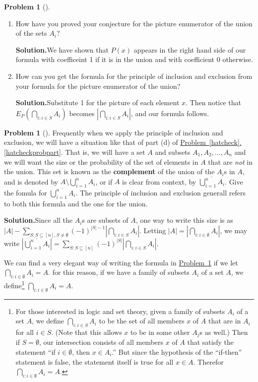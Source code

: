 \documentclass[10pt,]{book}
\newcommand{\terminology}[1]{\textbf{#1}}
\theoremstyle{plain}
\theoremstyle{definition}
\newtheorem{activity}[project]{Problem}
\theoremstyle{definition}
\numberwithin{equation}{chapter}
\begin{document}
\begin{activity}[]
\begin{enumerate}[font=\bfseries,label=(\alph*),ref=\alph*]
\item\label{task-172} How have you proved your conjecture for the picture enumerator of the union of the sets \(A_i\)?%
\par\medskip\noindent%
\textbf{Solution.}\quad We have shown that \(P(x)\) appears in the right hand side of our formula with coefficeint 1 if it is in the union and with coefficient 0 otherwise.%
\item\label{task-173} How can you get the formula for the principle of inclusion and exclusion from your formula for the picture enumerator of the union?%
\par\medskip\noindent%
\textbf{Solution.}\quad Substitute 1 for the picture of each element \(x\).  Then notice that \(E_P(\bigcap_{i:i \in S}A_i)\) becomes \(\left| \bigcap_{i:i \in S}A_i\right|\), and our formula follows.%
\end{enumerate}
\end{activity}
\begin{activity}[]\label{compunion}
Frequently when we apply the principle of inclusion and exclusion, we will have a situation like that of part (d) of \hyperref[hatcheckprobpart]{Problem~\ref{hatcheck}.\ref{hatcheckprobpart}}.  That is, we will have a set \(A\) and subsets \(A_1, A_2, \ldots, A_n\) and we will want the size or the probability of the set of elements in \(A\) that are \emph{not} in the union.  This set is known as the \terminology{complement}  of the union of the \(A_i\)s in \(A\), and is denoted by \(A \setminus \bigcup_{i=1}^n A_i\), or if \(A\) is clear from context, by \(\overline{\bigcup_{i=1}^n A_i}\). Give the fomula for \(\overline{\bigcup_{i=1}^n A_i}\).  The principle of inclusion and exclusion generall refers to both this formula and the one for the union.%
\par\medskip\noindent%
\textbf{Solution.}\quad Since all the \(A_i\)s are subsets of \(A\), one way to write this size is as \(|A| - \sum_{S:S \subseteq [n], S \ne \emptyset}(-1)^{|S|-1} |\bigcap_{i:i \in S}A_i|\).  Letting \(|A| = \left|\bigcap_{i:i \in \emptyset} A_i\right|\), we may write \(\left|\overline{\bigcup_{i=1}^n A_i}\right| = \sum_{S:S \subseteq [n]} (-1)^{|S|}\left| \bigcap_{i:i\in S} A_i\right|\).%
\end{activity}
We can find a very elegant way of writing the formula in \hyperref[compunion]{Problem~\ref{compunion}} if we let \(\bigcap_{i:i\in\emptyset}A_i = A\).  for this reason, if we have a family of subsets \(A_i\) of a set \(A\), we define\footnote{For those interested in logic and set theory, given a family of subsets \(A_i\) of a set \(A\), we define \(\bigcap_{i:i\in S}A_i\) to be the set of all members \(x\) of \(A\) that are in \(A_i\) for all \(i \in S\).  (Note that this allows \(x\) to be in some other \(A_j\)s as well.)  Then if \(S = \emptyset\), our intersection consists of all members \(x\) of \(A\) that satisfy the statement ``if \(i\in \emptyset\), then \(x \in A_i\).'' But since the hypothesis of the ``if-then'' statement is false, the statement itself is true for all \(x \in A\).  Therefor \(\bigcap_{i:i \in \emptyset}A_i = A\).\label{fn-16}} \(\bigcap_{i:i\in\emptyset}A_i = A\).%
\end{document}
